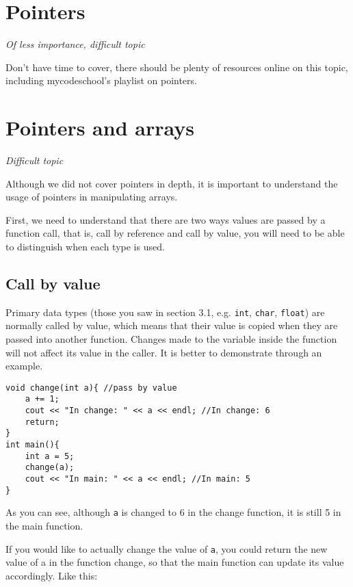 \section{Pointers}

\textit{Of less importance, difficult topic}
\vspace{6mm}

Don't have time to cover, there should be plenty of resources online on this topic, including mycodeschool's playlist on pointers.

\section{Pointers and arrays}

\textit{Difficult topic}
\vspace{6mm}

Although we did not cover pointers in depth, it is important to understand the usage of pointers in manipulating arrays. 

First, we need to understand that there are two ways values are passed by a function call, that is, call by reference and call by value, you will need to be able to distinguish when each type is used.

\subsection{Call by value}

Primary data types (those you saw in section 3.1, e.g. \texttt{int}, \texttt{char}, \texttt{float}) are normally called by value, which means that their value is copied when they are passed into another function. Changes made to the variable inside the function will not affect its value in the caller. It is better to demonstrate through an example.

\begin{lstlisting}
void change(int a){ //pass by value
    a += 1;
    cout << "In change: " << a << endl; //In change: 6
    return;
}
int main(){
    int a = 5;
    change(a);
    cout << "In main: " << a << endl; //In main: 5
}
\end{lstlisting}

As you can see, although \texttt{a} is changed to 6 in the change function, it is still 5 in the main function. 
\vspace{6mm}

If you would like to actually change the value of \texttt{a}, you could return the new value of a in the function change, so that the main function can update its value accordingly. Like this:

